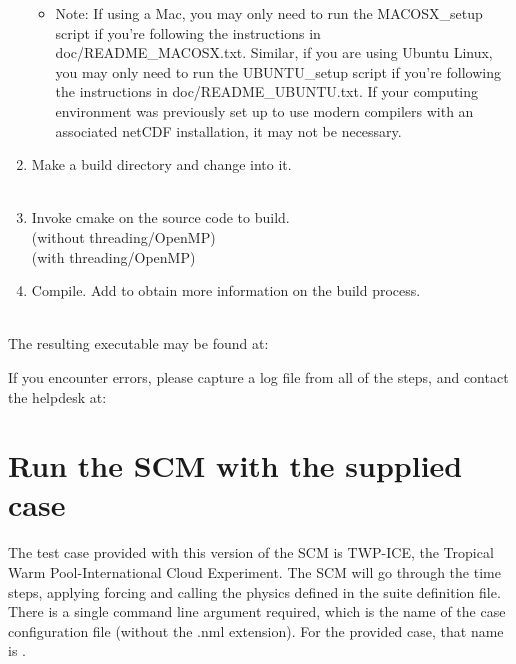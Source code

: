 \begin{enumerate}
  	\begin{itemize}
		\item Note: If using a Mac, you may only need to run the MACOSX\_setup script if you're following the instructions in doc/README\_MACOSX.txt. Similar, if you are using Ubuntu Linux, you may only need to run the UBUNTU\_setup script if you're following the instructions in doc/README\_UBUNTU.txt. If your computing environment was previously set up to use modern compilers with an associated netCDF installation, it may not be necessary.
	\end{itemize}

	\item Make a build directory and change into it.  \\
  \\

	\item Invoke cmake on the source code to build.  \\
   (without threading/OpenMP)\\
   (with threading/OpenMP)\\
	\item Compile. Add  to obtain more information on the build process. \\
  \\

\end{enumerate}

The resulting executable may be found at: 


If you encounter errors, please capture a log file from all of the steps, and contact the helpdesk at: 

\section{Run the SCM with the supplied case} 
The test case provided with this version of the SCM is TWP-ICE, the Tropical Warm Pool-International Cloud Experiment. The SCM will go through the time steps, applying forcing and calling the physics defined in the suite definition file.
There is a single command line argument required, which is the name of the case configuration file (without the .nml extension).  For the provided case, that name is .


